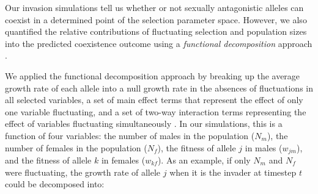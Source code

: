 \documentclass[12pt]{article}
\begin{document}
Our invasion simulations tell us whether or not sexually antagonistic alleles can coexist in a determined point of the selection parameter space. However, we also quantified the relative contributions of fluctuating selection and population sizes into the predicted coexistence outcome using a \textit{functional decomposition} approach \citep{ellner2016quantify,ellner_expanded_2019, shoemaker2020}.





We applied the functional decomposition approach by breaking up the average growth rate of each allele into a null growth rate in the absences of fluctuations in all selected variables, a set of main effect terms that represent the effect of only one variable fluctuating, and a set of two-way interaction terms representing the effect of variables fluctuating simultaneously \citep{ellner_expanded_2019}. In our simulations, this is a function of four variables: the number of males in the population ($N_{m}$), the number of females in the population ($N_{f}$), the fitness of allele $j$ in males ($w_{jm}$), and the fitness of allele $k$ in females ($w_{kf}$). As an example, if only $N_{m}$ and $N_{f}$ were fluctuating, the growth rate of allele $j$ when it is the invader at timestep $t$ could be decomposed into:
\end{document}
